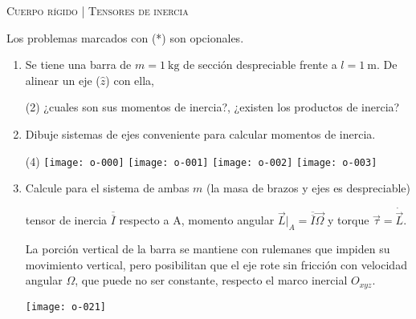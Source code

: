 \documentclass[11pt, spanish, a4paper, twoside]{article}
\begin{document}
\begin{center}
  \textsc{\large Cuerpo rígido | Tensores de inercia}
\end{center}

Los problemas marcados con (*) son opcionales.

\begin{enumerate}



\item Se tiene una barra de \(m= \SI{1}{\kilo\gram}\) de sección despreciable frente a \(l= \SI{1}{\metre}\).
De alinear un eje (\(\hat{z}\)) con ella, 
\begin{tasks}(2)
	\task	¿cuales son sus momentos de inercia?,
	\task ¿existen los productos de inercia? 
\end{tasks}


\item
Dibuje sistemas de ejes conveniente para calcular momentos de inercia.
\vspace{-1.1cm}
\begin{tasks}(4)
	\task \texttt{[image: o-000]}
	\task \texttt{[image: o-001]}
	\task \texttt{[image: o-002]}
	\task \texttt{[image: o-003]}
\end{tasks}



\item 
\begin{minipage}[t][4.5cm]{0.7\textwidth}
Calcule para el sistema de ambas $m$ (la masa de brazos y ejes es despreciable)
\begin{tasks} 
	\task tensor de inercia \(\overline{\overline{I}}\) respecto a A,
	\task momento angular $\vec{L}\bigg\rvert_A = \overline{\overline{I}} \vec{\Omega}$ y torque $\vec{\tau} = \dot{\vec{L}}$.
\end{tasks}
La porción vertical de la barra se mantiene con rulemanes que impiden su movimiento vertical, pero posibilitan que el eje rote sin fricción con velocidad angular $\Omega$, que puede no ser constante, respecto el marco inercial $O_{xyz}$.
\end{minipage}
\begin{minipage}[c][0cm][t]{0.25\textwidth}
	\texttt{[image: o-021]}
\end{minipage}




\end{enumerate}
\end{document}
